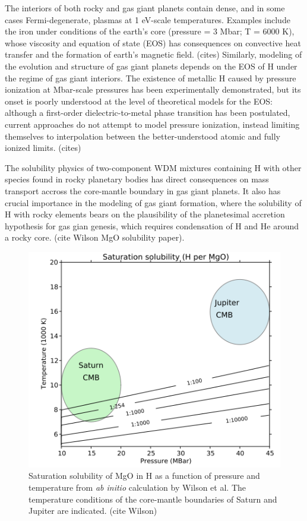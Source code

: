The interiors of both rocky and gas giant planets contain dense, and in some cases Fermi-degenerate, plasmas at 1 eV-scale temperatures. Examples include the iron under conditions of the earth's core (pressure = 3 Mbar; T = 6000 K), whose viscosity and equation of state (EOS) has consequences on convective heat transfer and the formation of earth's magnetic field. (cites) Similarly, modeling of the evolution and structure of gas giant planets depends on the EOS of H under the regime of gas giant interiors. The existence of metallic H caused by pressure ionization at Mbar-scale pressures has been experimentally demonstrated, but its onset is poorly understood at the level of theoretical models for the EOS: although a first-order dielectric-to-metal phase transition has been postulated, current approaches do not attempt to model pressure ionization, instead limiting themselves to interpolation between the better-understood atomic and fully ionized limits. (cites)

The solubility physics of two-component WDM mixtures containing H with other species found in rocky planetary bodies has direct consequences on mass transport accross the core-mantle boundary in gas giant planets. It also has crucial importance in the modeling of gas giant formation, where the solubility of H with rocky elements bears on the plausibility of the planetesimal accretion hypothesis for gas gian genesis, which requires condensation of H and He around a rocky core. (cite Wilson MgO solubility paper). 

\begin{figure}[h] \label{fig:wilson}
\caption{Saturation solubility of MgO in H as a function of pressure and temperature from \emph{ab initio} calculation by Wilson et al. The temperature conditions of the core-mantle boundaries of Saturn and Jupiter are indicated. (cite Wilson)}
\centering
\includegraphics[scale=0.65]{../Figures/wilson_solubility.png}
\end{figure}

